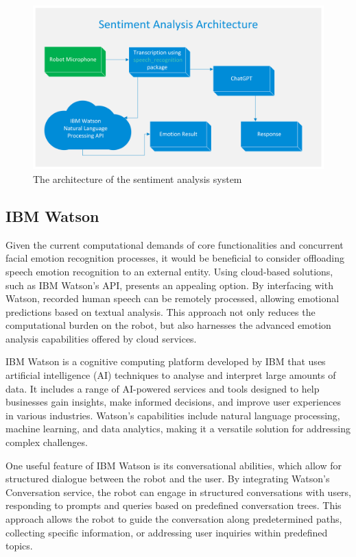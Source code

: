\begin{figure}[H]
    \centering{}
    \includegraphics[scale=0.28]{aed_images/sentiment_arch_actual.png}
    \caption{The architecture of the sentiment analysis system}
    \label{figure:sentiment_arch}
\end{figure}

\subsection{IBM Watson}

Given the current computational demands of core functionalities and concurrent facial emotion recognition processes, it would be beneficial to consider offloading speech emotion recognition to an external entity. Using cloud-based solutions, such as IBM Watson's API, presents an appealing option. By interfacing with Watson, recorded human speech can be remotely processed, allowing emotional predictions based on textual analysis. This approach not only reduces the computational burden on the robot, but also harnesses the advanced emotion analysis capabilities offered by cloud services.

IBM Watson is a cognitive computing platform developed by IBM that uses artificial intelligence (AI) techniques to analyse and interpret large amounts of data. It includes a range of AI-powered services and tools designed to help businesses gain insights, make informed decisions, and improve user experiences in various industries. Watson's capabilities include natural language processing, machine learning, and data analytics, making it a versatile solution for addressing complex challenges.

One useful feature of IBM Watson is its conversational abilities, which allow for structured dialogue between the robot and the user. By integrating Watson's Conversation service, the robot can engage in structured conversations with users, responding to prompts and queries based on predefined conversation trees. This approach allows the robot to guide the conversation along predetermined paths, collecting specific information, or addressing user inquiries within predefined topics.

